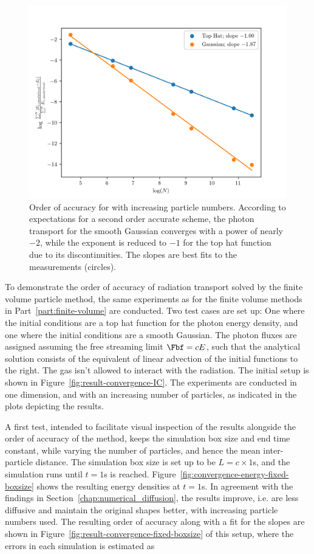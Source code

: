 \begin{figure}
    \centering
    \includegraphics[width=.75\textwidth]{figures/RHD/accuracy/convergence.png}%
    \caption{
Order of accuracy for \GEARRT with increasing particle numbers. According to expectations for a
second order accurate scheme, the photon transport for the smooth Gaussian converges with a power
of
nearly $-2$, while the exponent is reduced to $-1$ for the top hat function due to its
discontinuities. The slopes are best fits to the measurements (circles).
    }
    \label{fig:result-convergence}
\end{figure}




To demonstrate the order of accuracy of radiation transport solved by the finite volume particle
method, the same experiments as for the finite volume methods in Part~\ref{part:finite-volume} are
conducted. Two test cases are set up: One where the initial conditions are a top hat function for
the photon energy density, and one where the initial conditions are a smooth Gaussian. The photon
fluxes are assigned assuming the free streaming limit $\Fbf = c E$, such that the analytical
solution consists of the equivalent of linear advection of the initial functions to the right. The
gas isn't allowed to interact with the radiation. The initial setup is shown in
Figure~\ref{fig:result-convergence-IC}. The experiments are conducted in one dimension, and with an
increasing number of particles, as indicated in the plots depicting the results.

A first test, intended to facilitate visual inspection of the results alongside the order of
accuracy of the method, keeps the simulation box size and end time constant, while varying the
number of particles, and hence the mean inter-particle distance. The simulation box size is set up
to be $L = c \times 1$s, and the simulation runs until $t = 1$s is reached.
%
Figure~\ref{fig:convergence-energy-fixed-boxsize} shows the resulting energy densities at $t = 1$s.
In agreement with the findings in Section~\ref{chap:numerical_diffusion}, the results improve, i.e.
are less diffusive and maintain the original shapes better, with increasing particle numbers used.
The resulting order of accuracy along with a fit for the slopes are shown in
Figure~\ref{fig:result-convergence-fixed-boxsize} of this setup, where the errors in each simulation
is estimated as

